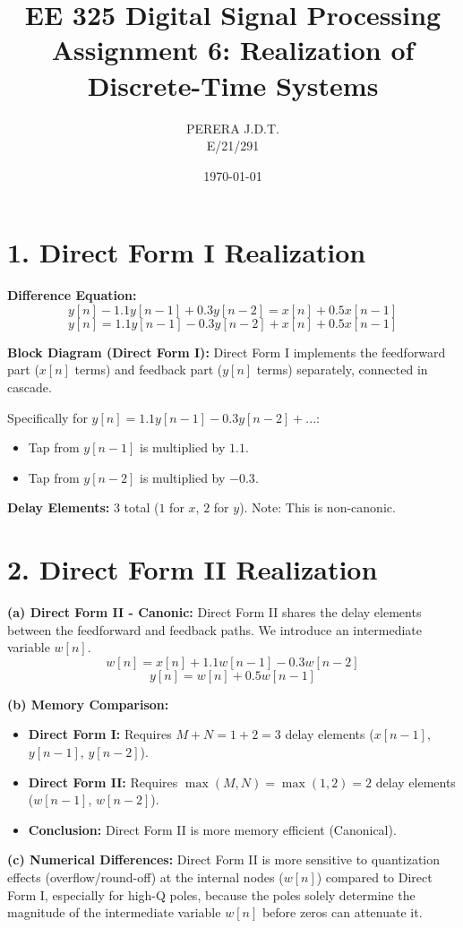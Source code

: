 \documentclass[11pt, a4paper]{article}
\title{EE 325 Digital Signal Processing \\ Assignment 6: Realization of Discrete-Time Systems}
\author{PERERA J.D.T. \\ E/21/291}
\date{\today}
\begin{document}
\maketitle

\section{1. Direct Form I Realization}
\textbf{Difference Equation:}
$$y[n] - 1.1y[n-1] + 0.3y[n-2] = x[n] + 0.5x[n-1]$$
$$y[n] = 1.1y[n-1] - 0.3y[n-2] + x[n] + 0.5x[n-1]$$

\textbf{Block Diagram (Direct Form I):}
Direct Form I implements the feedforward part ($x[n]$ terms) and feedback part ($y[n]$ terms) separately, connected in cascade.

Specifically for $y[n] = 1.1y[n-1] - 0.3y[n-2] + ...$:
\begin{itemize}
    \item Tap from $y[n-1]$ is multiplied by $1.1$.
    \item Tap from $y[n-2]$ is multiplied by $-0.3$.
\end{itemize}

\textbf{Delay Elements:} 3 total ($1$ for $x$, $2$ for $y$). Note: This is non-canonic.

\section{2. Direct Form II Realization}
\textbf{(a) Direct Form II - Canonic:}
Direct Form II shares the delay elements between the feedforward and feedback paths. We introduce an intermediate variable $w[n]$.
$$w[n] = x[n] + 1.1w[n-1] - 0.3w[n-2]$$
$$y[n] = w[n] + 0.5w[n-1]$$

\textbf{(b) Memory Comparison:}
\begin{itemize}
    \item \textbf{Direct Form I:} Requires $M + N = 1 + 2 = 3$ delay elements ($x[n-1]$, $y[n-1]$, $y[n-2]$).
    \item \textbf{Direct Form II:} Requires $\max(M, N) = \max(1, 2) = 2$ delay elements ($w[n-1]$, $w[n-2]$).
    \item \textbf{Conclusion:} Direct Form II is more memory efficient (Canonical).
\end{itemize}

\textbf{(c) Numerical Differences:}
Direct Form II is more sensitive to quantization effects (overflow/round-off) at the internal nodes ($w[n]$) compared to Direct Form I, especially for high-Q poles, because the poles solely determine the magnitude of the intermediate variable $w[n]$ before zeros can attenuate it.
\end{document}
